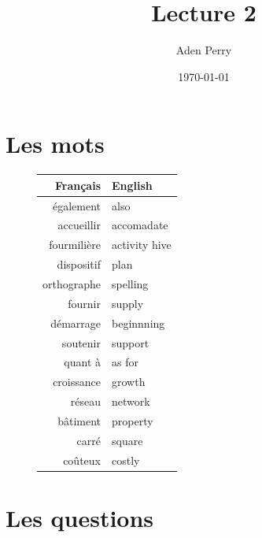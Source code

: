 \documentclass{article}
\title{Lecture 2}
\author{Aden Perry}
\date{\today}
\begin{document}
\maketitle

\section{Les mots}

\begin{figure}[ht]
	\center
	\begin{tabular}{rl}
		Français    & English       \\
		\hline
		\hline
		également   & also          \\
		accueillir  & accomadate    \\
		fourmilière & activity hive \\
		dispositif  & plan          \\
		orthographe & spelling      \\
		fournir     & supply        \\
		démarrage   & beginnning    \\
		soutenir    & support       \\
		quant à     & as for        \\
		croissance  & growth        \\
		réseau      & network       \\
		bâtiment    & property      \\
		carré       & square        \\
		coûteux     & costly        \\
		\hline
		\hline
	\end{tabular}
\end{figure}

\section{Les questions}
\end{document}
